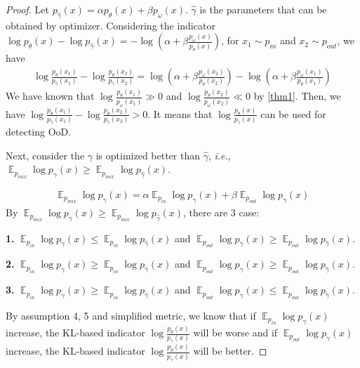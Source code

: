 \documentclass[a3paper]{article}
\newtheorem*{proof}{\it{Proof.}\rm}
\newcommand{\IE}{\textit{i.e.}, }
\newcommand{\E}{\operatorname{\mathbb{E}}}
\newcommand{\pin}{p_{in}}
\newcommand{\pout}{p_{out}}
\newcommand{\pmix}{p_{mix}}
\begin{document}
\begin{proof}
	Let $p_{\hat{\gamma}}(x) = \alpha p_\theta(x) + \beta p_\omega(x)$. $\hat{\gamma}$ is the parameters that can be obtained by optimizer. 
	Considering the indicator $\log p_\theta(x) - \log p_{\hat{\gamma}}(x) = -\log (\alpha + \beta \frac{p_\omega(x)}{p_\theta(x)})$, for $x_1 \sim \pin$ and $x_2 \sim \pout$, we have 
	\begin{align*}
		\log \frac{p_\theta(x_1)}{p_{\hat{\gamma}}(x_1)} - \log \frac{p_\theta(x_2)}{p_{\hat{\gamma}}(x_2)} = \log (\alpha + \beta \frac{p_\omega(x_2)}{p_\theta(x_2)}) - \log (\alpha + \beta \frac{p_\omega(x_1)}{p_\theta(x_1)})
	\end{align*}
	We have known that $\log \frac{p_\theta(x_1)}{p_\omega(x_1)} \gg 0$ and $\log \frac{p_\theta(x_2)}{p_\omega(x_2)} \ll 0$ by \cref{thm1}. Then, we have $\log \frac{p_\theta(x_1)}{p_{\hat{\gamma}}(x_1)} - \log \frac{p_\theta(x_2)}{p_{\hat{\gamma}}(x_2)} > 0$. It means that $\log \frac{p_\theta(x)}{p_{\hat{\gamma}}(x)}$ can be used for detecting OoD.
	
	Next, consider the $\gamma$ is optimized better than $\hat{\gamma}$, \IE $\E_{\pmix} \log p_\gamma(x) \geq \E_{\pmix} \log p_{\hat{\gamma}}(x)$. 
	
	\begin{align*}
		\E_{\pmix} \log p_\gamma(x) = \alpha \E_{\pin} \log p_\gamma(x) + \beta \E_{\pout} \log p_\gamma(x)
	\end{align*}
	By $\E_{\pmix} \log p_\gamma(x) \geq \E_{\pmix} \log p_{\hat{\gamma}}(x)$, there are 3 case:
	
	\textbf{1.} $\E_{\pin} \log p_\gamma(x) \leq \E_{\pin} \log p_{\hat\gamma}(x)$ and $\E_{\pout} \log p_\gamma(x) \geq \E_{\pout} \log p_{\hat\gamma}(x)$. 
	
	\textbf{2.} $\E_{\pin} \log p_\gamma(x) \geq \E_{\pin} \log p_{\hat\gamma}(x)$ and $\E_{\pout} \log p_\gamma(x) \geq \E_{\pout} \log p_{\hat\gamma}(x)$. 
	
	
	\textbf{3.} $\E_{\pin} \log p_\gamma(x) \geq \E_{\pin} \log p_{\hat\gamma}(x)$ and $\E_{\pout} \log p_\gamma(x) \leq \E_{\pout} \log p_{\hat\gamma}(x)$. 
	
	By assumption 4, 5 and simplified metric, we know that if  $\E_{\pin} \log p_\gamma(x)$ increase, the KL-based indicator $\log \frac{p_\theta(x)}{p_{{\gamma}}(x)}$ will be worse and if  $\E_{\pout} \log p_\gamma(x)$ increase, the KL-based indicator $\log \frac{p_\theta(x)}{p_{{\gamma}}(x)}$ will be better. 
	

\end{proof}
\end{document}
